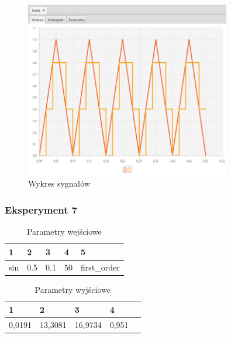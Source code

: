 \documentclass[12pt]{article}
\begin{document}
{{{                \begin{figure}[H]
                    \centering
                    \includegraphics[width=0.8\textwidth]{img/result/experiment2/06/data_draw_original_chart_recon_output_130428.png}
                    \caption{Wykres sygnałów}
                \end{figure}
            }
            \newpage

            \subsubsection{Eksperyment 7} {
                \begin{table}[H]
                    \centering
                    \begin{tabular}{|l|l|l|l|l|}
                        \hline
                        1 & 2 & 3 & 4 & 5   \\ \hline
                        sin & 0.5 & 0.1 & 50 & first\_order  \\ \hline
                    \end{tabular}
                    \caption{Parametry wejściowe}
                \end{table}

                \begin{table}[H]
                    \centering
                    \begin{tabular}{|l|l|l|l|l|}
                        \hline
                        1 & 2 & 3 & 4   \\ \hline
                        0,0191 & 13,3081 & 16,9734 & 0,951 \\ \hline
                    \end{tabular}
                    \caption{Parametry wyjściowe}
                \end{table}


}}}
\end{document}
